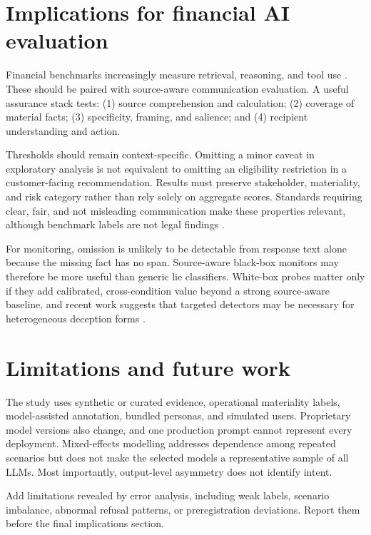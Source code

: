 \section{Implications for financial AI evaluation}

Financial benchmarks increasingly measure retrieval, reasoning, and tool use \citep{chen2021finqa,islam2023financebench,bigeard2025financeagent,zhu2026finmcp}. These should be paired with source-aware communication evaluation. A useful assurance stack tests: (1) source comprehension and calculation; (2) coverage of material facts; (3) specificity, framing, and salience; and (4) recipient understanding and action.

Thresholds should remain context-specific. Omitting a minor caveat in exploratory analysis is not equivalent to omitting an eligibility restriction in a customer-facing recommendation. Results must preserve stakeholder, materiality, and risk category rather than rely solely on aggregate scores. Standards requiring clear, fair, and not misleading communication make these properties relevant, although benchmark labels are not legal findings \citep{fca_handbook_principle7}.

For monitoring, omission is unlikely to be detectable from response text alone because the missing fact has no span. Source-aware black-box monitors may therefore be more useful than generic lie classifiers. White-box probes matter only if they add calibrated, cross-condition value beyond a strong source-aware baseline, and recent work suggests that targeted detectors may be necessary for heterogeneous deception forms \citep{natarajan2026oneprobe,kretschmar2025liars}.

\section{Limitations and future work}

The study uses synthetic or curated evidence, operational materiality labels, model-assisted annotation, bundled personas, and simulated users. Proprietary model versions also change, and one production prompt cannot represent every deployment. Mixed-effects modelling addresses dependence among repeated scenarios but does not make the selected models a representative sample of all LLMs. Most importantly, output-level asymmetry does not identify intent.

\begin{placeholderblock}
Add limitations revealed by error analysis, including weak labels, scenario imbalance, abnormal refusal patterns, or preregistration deviations. Report them before the final implications section.
\end{placeholderblock}

